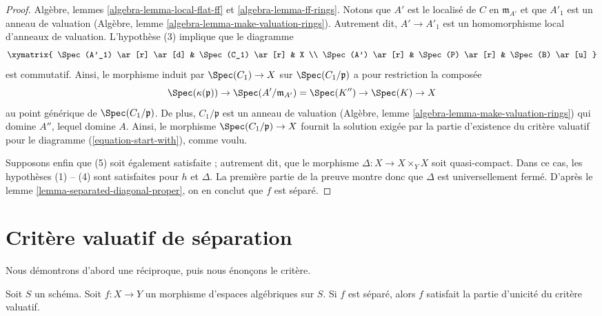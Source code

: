 \begin{proof}
Algèbre, lemmes \ref{algebra-lemma-local-flat-ff} et
\ref{algebra-lemma-ff-rings}.
Notons que $A'$ est le localisé de $C$ en $\mathfrak m_{A'}$
et que $A'_1$ est un anneau de valuation
(Algèbre, lemme \ref{algebra-lemma-make-valuation-rings}).
Autrement dit, $A' \to A'_1$ est un homomorphisme local d'anneaux de
valuation. L'hypothèse (3) implique que le diagramme
$$
\xymatrix{
\Spec(A'_1) \ar[r] \ar[d] & \Spec(C_1) \ar[r] & X \\
\Spec(A') \ar[r] & \Spec(P) \ar[r] & \Spec(B) \ar[u]
}
$$
est commutatif. Ainsi, le morphisme induit par $\Spec(C_1) \to X$
sur $\Spec(C_1/\mathfrak p)$ a pour restriction la composée
$$
\Spec(\kappa(\mathfrak p)) \to
\Spec(A'/\mathfrak m_{A'}) = \Spec(K'') \to
\Spec(K) \to X
$$
au point générique de $\Spec(C_1/\mathfrak p)$. De plus,
$C_1/\mathfrak p$ est un anneau de valuation
(Algèbre, lemme \ref{algebra-lemma-make-valuation-rings})
qui domine $A''$, lequel domine $A$.
Ainsi, le morphisme $\Spec(C_1/\mathfrak p) \to X$ fournit la solution exigée par la
partie d'existence du critère valuatif pour le diagramme
(\ref{equation-start-with}), comme voulu.

\medskip\noindent
Supposons enfin que (5) soit également satisfaite ; autrement dit, que le morphisme
$\Delta : X \to X \times_Y X$ soit quasi-compact. Dans ce cas,
les hypothèses (1) -- (4) sont satisfaites pour $h$ et $\Delta$. La première
partie de la preuve montre donc que $\Delta$ est universellement fermé.
D'après le lemme \ref{lemma-separated-diagonal-proper}, on en conclut que
$f$ est séparé.
\end{proof}

















\section{Critère valuatif de séparation}
\label{section-valuative-separatedness}

\noindent
Nous démontrons d'abord une réciproque, puis nous énonçons le critère.

\begin{lemma}
\label{lemma-separated-implies-valuative}
Soit $S$ un schéma.
Soit $f : X \to Y$ un morphisme d'espaces algébriques sur $S$.
Si $f$ est séparé, alors $f$ satisfait la partie
d'unicité du critère valuatif.
\end{lemma}

